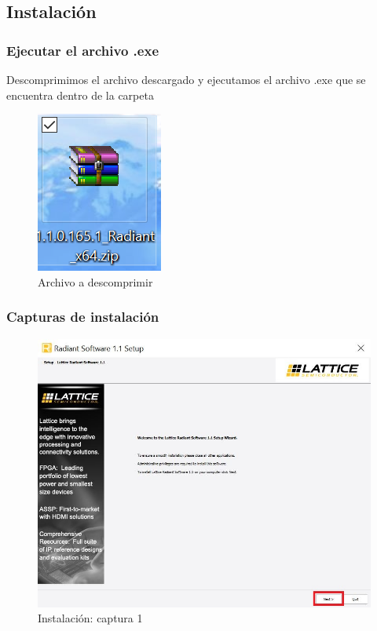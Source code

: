 \documentclass{article}
\begin{document}
\subsection{Instalación}
\subsubsection{Ejecutar el archivo .exe}

Descomprimimos el archivo descargado y ejecutamos el archivo .exe que se encuentra dentro de la carpeta
\begin{figure}[H]
\centering
\includegraphics[width=0.1\linewidth]{images/zip.PNG}
\caption{Archivo a descomprimir}
\label{fig:install}
\end{figure}

\newpage

\subsubsection{Capturas de instalación}

\begin{figure}[H]
\centering
\includegraphics[width=0.8\linewidth]{images/inst1.JPG}
\caption{Instalación: captura 1 }
\label{fig:install}
\end{figure}
\end{document}
